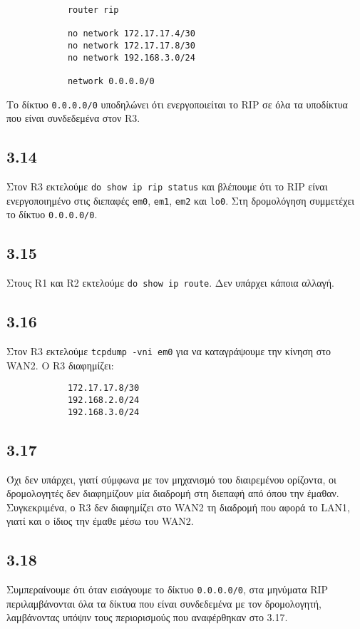 \documentclass[a4paper, 12pt]{article}
\begin{document}
		\begin{verbatim}
			router rip
			
			no network 172.17.17.4/30
			no network 172.17.17.8/30
			no network 192.168.3.0/24
			
			network 0.0.0.0/0
		\end{verbatim}
		
		Το δίκτυο \verb|0.0.0.0/0| υποδηλώνει ότι ενεργοποιείται το RIP σε όλα τα υποδίκτυα που είναι συνδεδεμένα στον R3.

	\subsection*{3.14}
		Στον R3 εκτελούμε \verb|do show ip rip status| και βλέπουμε ότι το RIP είναι ενεργοποιημένο στις διεπαφές \verb|em0|, \verb|em1|, \verb|em2| και \verb|lo0|. Στη δρομολόγηση συμμετέχει το δίκτυο \verb|0.0.0.0/0|.

	\subsection*{3.15}
		Στους R1 και R2 εκτελούμε \verb|do show ip route|. Δεν υπάρχει κάποια αλλαγή.

	\subsection*{3.16}
		Στον R3 εκτελούμε \verb|tcpdump -vni em0| για να καταγράψουμε την κίνηση στο WAN2. Ο R3 διαφημίζει:
		
		\begin{verbatim}
			172.17.17.8/30
			192.168.2.0/24
			192.168.3.0/24
		\end{verbatim}

	\subsection*{3.17}
		Όχι δεν υπάρχει, γιατί σύμφωνα με τον μηχανισμό του διαιρεμένου ορίζοντα, οι δρομολογητές δεν διαφημίζουν μία διαδρομή στη διεπαφή από όπου την έμαθαν. Συγκεκριμένα, ο R3 δεν διαφημίζει στο WAN2 τη διαδρομή που αφορά το LAN1, γιατί και ο ίδιος την έμαθε μέσω του WAN2.

	\subsection*{3.18}
		Συμπεραίνουμε ότι όταν εισάγουμε το δίκτυο \verb|0.0.0.0/0|, στα μηνύματα RIP περιλαμβάνονται όλα τα δίκτυα που είναι συνδεδεμένα με τον δρομολογητή, λαμβάνοντας υπόψιν τους περιορισμούς που αναφέρθηκαν στο 3.17.
		
\end{document}
